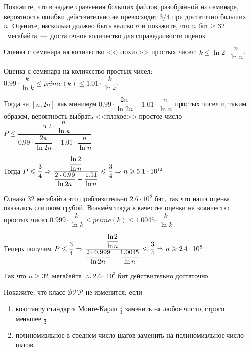 \documentclass[a4paper,12pt]{article}
\begin{document}
\begin{task}
	Покажите, что в задаче сравнения больших файлов, разобранной на семинаре, вероятность ошибки действительно не превосходит $3/4$ при достаточно больших $n$. Оцените, насколько должно быть велико $n$ и покажите, что $n \textrm{ бит} \geq 32$~мегабайта~---~достаточное количество для справедливости оценок.
\end{task}

\begin{solution}
	Оценка с семинара на количество <<плохих>> простых чисел: $k \le \ln 2 \cdot \dfrac{n}{\ln n}$.
	
	Оценка с семинара на количество простых чисел: $0.99 \cdot \dfrac{k}{\ln k} \le prime(k) \le 1.01 \cdot \dfrac{k}{\ln k}$.
	
	Тогда на $[n, 2n]$ как минимум $0.99 \cdot \dfrac{2n}{\ln 2n} - 1.01 \cdot \dfrac{n}{\ln n}$ простых чисел и, таким образом, вероятность выбрать <<плохое>> простое число $P \le \dfrac{\ln 2 \cdot \dfrac{n}{\ln n}}{0.99 \cdot \dfrac{2n}{\ln 2n} - 1.01 \cdot \dfrac{n}{\ln n}}$
	
	Тогда $P \leqslant \dfrac{3}{4} \Rightarrow \dfrac{\dfrac{\ln 2}{\ln n}}{\dfrac{2 \cdot 0.99}{\ln 2n} - \dfrac{1.01}{\ln n}} \leqslant \dfrac{3}{4} \Rightarrow n \geqslant 5.1 \cdot 10^{12}$
	
	Однако 32 мегабайта это приблизительно $2.6 \cdot 10^{8}$ бит, так что наша оценка оказалась слишком грубой. Возьмём тогда в качестве оценки на количество простых чисел $0.999 \cdot \dfrac{k}{\ln k} \le prime(k) \le 1.0045 \cdot \dfrac{k}{\ln k}$.
	
	Теперь получим $P \leqslant \dfrac{3}{4} \Rightarrow \dfrac{\dfrac{\ln 2}{\ln n}}{\dfrac{2 \cdot 0.999}{\ln 2n} - \dfrac{1.0045}{\ln n}} \leqslant \dfrac{3}{4} \Rightarrow n \geqslant 2.4 \cdot 10^{8}$
	
	Так что $n \ge 32$~мегабайта $\approx 2.6 \cdot 10^{8}$ бит действительно достаточно
\end{solution}

\begin{task}
	Покажите, что класс $\mathcal{BPP}$ не изменится, если 
	\begin{enumerate}
		\item константу стандарта Монте-Карло $\frac13$  заменить на любое число, строго меньшее $\frac12$
		\item полиномиальное в среднем число шагов заменить на полиномиальное число шагов.
	\end{enumerate}
\end{task}
\end{document}
